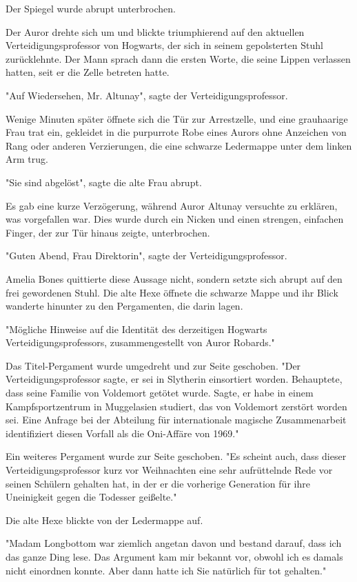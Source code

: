{Der Spiegel wurde abrupt unterbrochen.

Der Auror drehte sich um und blickte triumphierend auf den aktuellen Verteidigungsprofessor von Hogwarts, der sich in seinem gepolsterten Stuhl zurücklehnte. Der Mann sprach dann die ersten Worte, die seine Lippen verlassen hatten, seit er die Zelle betreten hatte.

"Auf Wiedersehen, Mr. Altunay", sagte der Verteidigungsprofessor.

Wenige Minuten später öffnete sich die Tür zur Arrestzelle, und eine grauhaarige Frau trat ein, gekleidet in die purpurrote Robe eines Aurors ohne Anzeichen von Rang oder anderen Verzierungen, die eine schwarze Ledermappe unter dem linken Arm trug.

"Sie sind abgelöst", sagte die alte Frau abrupt.

Es gab eine kurze Verzögerung, während Auror Altunay versuchte zu erklären, was vorgefallen war. Dies wurde durch ein Nicken und einen strengen, einfachen Finger, der zur Tür hinaus zeigte, unterbrochen.

"Guten Abend, Frau Direktorin", sagte der Verteidigungsprofessor.

Amelia Bones quittierte diese Aussage nicht, sondern setzte sich abrupt auf den frei gewordenen Stuhl. Die alte Hexe öffnete die schwarze Mappe und ihr Blick wanderte hinunter zu den Pergamenten, die darin lagen.

"Mögliche Hinweise auf die Identität des derzeitigen Hogwarts Verteidigungsprofessors, zusammengestellt von Auror Robards."

Das Titel-Pergament wurde umgedreht und zur Seite geschoben. "Der Verteidigungsprofessor sagte, er sei in Slytherin einsortiert worden. Behauptete, dass seine Familie von Voldemort getötet wurde. Sagte, er habe in einem Kampfsportzentrum in Muggelasien studiert, das von Voldemort zerstört worden sei. Eine Anfrage bei der Abteilung für internationale magische Zusammenarbeit identifiziert diesen Vorfall als die Oni-Affäre von 1969."

Ein weiteres Pergament wurde zur Seite geschoben. "Es scheint auch, dass dieser Verteidigungsprofessor kurz vor Weihnachten eine sehr aufrüttelnde Rede vor seinen Schülern gehalten hat, in der er die vorherige Generation für ihre Uneinigkeit gegen die Todesser geißelte."

Die alte Hexe blickte von der Ledermappe auf.

"Madam Longbottom war ziemlich angetan davon und bestand darauf, dass ich das ganze Ding lese. Das Argument kam mir bekannt vor, obwohl ich es damals nicht einordnen konnte. Aber dann hatte ich Sie natürlich für tot gehalten."

}
